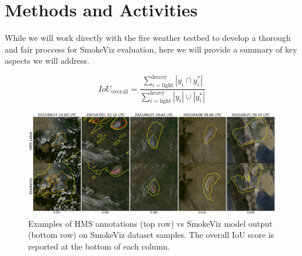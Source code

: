 \section{Methods and Activities}

While we will work directly with the fire weather testbed to develop a thorough and fair proccess for SmokeViz evaluation, here we will provide a summary of key aspects we will address.

\begin{equation} \label{overall_iou}
    IoU_{\text{overall}} = \frac{\sum\limits_{i=\text{light}}^{\text{heavy}}|y_{i}\cap y^*_{i}|}{\sum\limits_{i=\text{light}}^{\text{heavy}}|y_{i}|\cup|y^*_{i}|}
\end{equation}

\begin{figure}
    \centering
    \includegraphics[width=17cm]{figures/examples.png}
    \caption{Examples of HMS annotations (top row) vs SmokeViz model output (bottom row) on SmokeViz dataset samples. The overall IoU score is reported at the bottom of each column.}\label{examples}
\end{figure}

